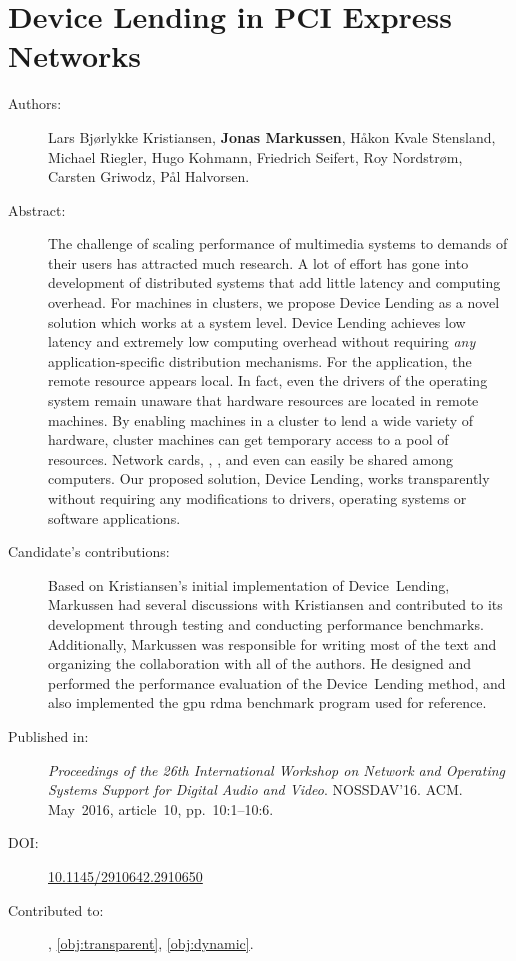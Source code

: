 \chapter{Device Lending in PCI Express Networks}
\label{paper:nossdav}
\paperthumb

\begin{description}
	\item[Authors:]
		Lars Bj{\o}rlykke Kristiansen, \textbf{Jonas Markussen}, H{\aa}kon Kvale Stensland,
		Michael Riegler, Hugo Kohmann, Friedrich Seifert, Roy Nordstr{\o}m, Carsten Griwodz, P{\aa}l Halvorsen.

	\item[Abstract:]
		The challenge of scaling  performance of multimedia systems to demands
		of their users has attracted much research.
		A lot of effort has gone into
		development of distributed systems that add little latency and computing overhead.
		For machines in  clusters,
		we propose Device Lending as a novel solution which works at a system
		level.
		Device Lending achieves low latency and extremely low computing overhead without
		requiring \textit{any} application-specific distribution mechanisms.
		For the application, the remote  resource appears local.
		In fact, even the drivers of the operating system remain unaware that
		hardware resources are located in remote machines.
		By enabling machines in a  cluster to lend a wide variety of hardware, 
		cluster machines can get temporary access to a pool of  resources. 
		Network cards, , , and even  can easily 
		be shared among computers.
		Our proposed solution, Device Lending, works transparently without requiring any modifications to drivers,
		operating systems or software applications.

	\item[Candidate's contributions:]
		Based on Kristiansen's initial implementation of Device~Lending, Markussen had several discussions with Kristiansen and contributed to its development through testing and conducting performance benchmarks.
		Additionally, Markussen was responsible for writing most of the text and organizing the collaboration with all of the authors.
		He designed and performed the performance evaluation of the Device~Lending method, and also implemented the \acrshort{gpu} \acrshort{rdma} benchmark program used for reference.
		

	\item[Published in:]
		\emph{Proceedings of the 26th International Workshop on Network and Operating Systems Support for Digital Audio and Video}.
		NOSSDAV'16. ACM.
		May~2016, article~10, pp.~10:1--10:6.

	\item[DOI:] \href{https://doi.org/10.1145/2910642.2910650}{10.1145/2910642.2910650}

	\item[Contributed to:]
		, \cref{obj:transparent}, \cref{obj:dynamic}.

\end{description}

